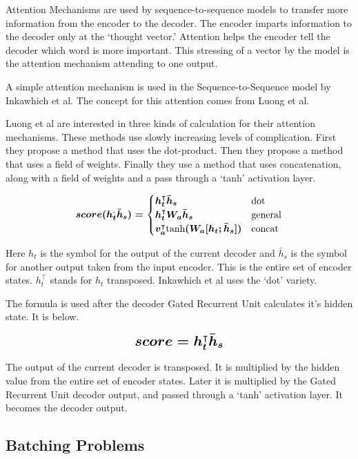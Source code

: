 Attention Mechanisms are used by sequence-to-sequence models to transfer more information from the encoder to the decoder. The encoder imparts information to the decoder only at the `thought vector.' Attention helps the encoder tell the decoder which word is more important. This stressing of a vector by the model is the attention mechanism attending to one output.

A simple attention mechanism is used in the Sequence-to-Sequence model by Inkawhich et al. \cite{2018Inkawhich} The concept for this attention comes from Luong et al. \cite{DBLP:journals/corr/LuongPM15}

Luong et al \cite{DBLP:journals/corr/LuongPM15} are interested in three kinds of calculation for their attention mechanisms. These methods use slowly increasing levels of complication. First they propose a method that uses the dot-product. Then they propose a method that uses a field of weights. Finally they use a method that uses concatenation, along with a field of weights and a pass through a `tanh' activation layer.

$$
\boldmath
score(h_t^ \text{,} \bar{h}_s) =
\begin{cases}
    h_t^\intercal \bar{h}_s & \text{dot} \\
	h_t^\intercal W_a \bar{h}_s & \text{general} \\
	v_a^\intercal \text{tanh}(W_a [h_t ; \bar{h}_s] ) & \text{concat}
\end{cases}
\unboldmath
$$

Here $h_t$ is the symbol for the output of the current decoder and $\bar{h}_s $ is the symbol for another output taken from the input encoder. This is the entire set of encoder states. $h_t^\intercal$ stands for $h_t$ transposed. Inkawhich et al \cite{2018Inkawhich} uses the `dot' variety.

The formula is used after the decoder Gated Recurrent Unit calculates it's hidden state. It is below.

$$ 
\boldmath
\mathlarger{ \mathlarger{
score = h_t^\intercal \bar{h}_s 
} }
\unboldmath
$$ 

The output of the current decoder is transposed. It is multiplied by the hidden value from the entire set of encoder states. Later it is multiplied by the Gated Recurrent Unit decoder output, and passed through a `tanh' activation layer. It becomes the decoder output.

\subsection{Batching Problems}

